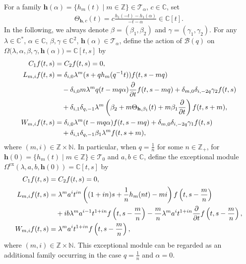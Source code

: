 \documentclass[a4paper]{amsart}
\numberwithin{equation}{section}
\begin{document}
For a family $\mathbf h(\alpha)=\{h_m(t)\mid m\in\mathbb Z\}\in \mathcal{T}_{\alpha}$, $c\in  \mathbb{C}$, set
\begin{align*}
\Theta_{\mathbf h,c}(t)
=c\frac{h_1(-t)-h_1(\alpha)}{-t-\alpha}\in\mathbb C[t].
\end{align*}
In the following, we always denote $\beta=(\beta_{1},\beta_{2})$ and $\gamma=(\gamma_{1},\gamma_{2})$.
 For any $\lambda\in\mathbb{C}^*$, $\alpha\in\mathbb{C}$, $\beta,\gamma\in \mathbb{C}^{2}$, $\mathbf h(\alpha)\in \mathcal{T}_{\alpha}$,
define the action of $\mathcal{B}(q)$ on $\Omega\big(\lambda,\alpha,\beta,\gamma,\mathbf h(\alpha)\big)=\mathbb C[t,s]$ by
     \begin{align}
C_{1}f(t,s)&=C_{2}f(t,s)=0,\label{C3.1}\\
L_{m,i}f(t,s)
&=\delta_{i,0}\lambda^{m}(s+qh_m(q^{-1}t))
f(t,s-mq)\label{L3.2}\\
&\quad-\delta_{i,0}m\lambda^{m}q(t-mq\alpha)
\frac{\partial}{\partial t}f(t,s-mq)
+\delta_{m,0}\delta_{i,-2q}\gamma_2f(t,s)\notag\\
&\quad+\delta_{i,1}\delta_{q,-1}\lambda^m
\left(\beta_2+m\Theta_{\mathbf h,\beta_1}(t)+m\beta_1 
\frac{\partial}{\partial t}\right)
f(t,s+m),
\notag\\
W_{m,i}f(t,s)
&=\delta_{i,0}\lambda^m(t-mq\alpha)f(t,s-mq)
+\delta_{m,0}\delta_{i,-2q}\gamma_1f(t,s)\label{W3.3}\\
&\quad+\delta_{i,1}\delta_{q,-1}\beta_1\lambda^m
f(t,s+m),\notag
\end{align}
where $(m,i)\in \mathbb{Z}\times \mathbb{N}$. 
In particular, when $q=\frac1n$ for some $n\in\mathbb Z_{+}$, for $\mathbf{h}(0)=\{h_{m}(t)\mid m\in\mathbb{Z}\}\in\mathcal{T}_{0}$ and $a,b\in\mathbb{C}$, define the exceptional module $\Omega^{\mathrm{ex}}(\lambda,a,b,\mathbf h(0))=\mathbb C[t,s]$ by
\begin{align}
C_1 f(t,s)&=C_2 f(t,s)=0,\notag \\
L_{m,i}f(t,s)
&=
\lambda^m a^i t^{in}
\left((1+in)s+\frac1n h_m(nt)-mi\right)
f\left(t,s-\frac mn\right) \label{eq:ex-L}\\
&\quad
+ib\lambda^m a^{i-1} t^{1+in}
f\left(t,s-\frac mn\right) 
-\frac mn\lambda^m a^i t^{1+in}
\frac{\partial}{\partial t}
f\left(t,s-\frac mn\right),\notag
\\
W_{m,i}f(t,s)
&=
\lambda^m a^i t^{1+in}
f\left(t,s-\frac mn\right),
\label{eq:ex-W}
\end{align}
where $(m,i)\in\mathbb Z\times\mathbb N$. 
 This exceptional module can be regarded as an additional family occurring in the case $q=\frac1n$ and $\alpha=0$. 
 
\end{document}
